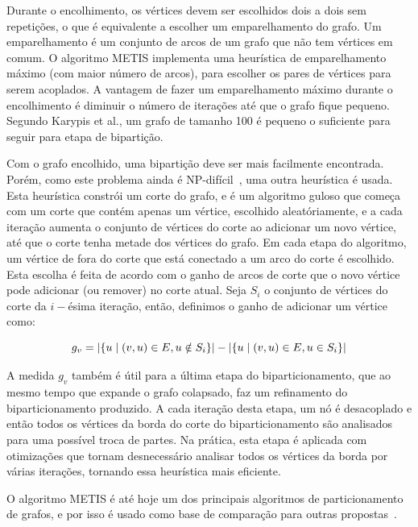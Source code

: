 \documentclass[conference]{IEEEtran}
\DeclarePairedDelimiter\abs{\lvert}{\rvert}
\begin{document}
Durante o encolhimento, os vértices devem ser escolhidos dois a dois sem
repetições, o que é equivalente a escolher um emparelhamento do grafo.
Um emparelhamento é um conjunto de arcos de um grafo que não tem
vértices em comum. O algoritmo METIS implementa uma heurística
de emparelhamento máximo (com maior número de arcos), para escolher os
pares de vértices para serem acoplados. A vantagem de fazer um
emparelhamento máximo durante o encolhimento é diminuir o número de
iterações até que o grafo fique pequeno. Segundo Karypis et al., um
grafo de tamanho 100 é pequeno o suficiente para seguir para etapa de
bipartição.

Com o grafo encolhido, uma bipartição deve ser mais facilmente
encontrada. Porém, como este problema ainda é
NP-difícil~\cite{graphpartitioning}, uma outra heurística é usada. Esta
heurística constrói um corte do grafo, e é um algoritmo guloso que
começa com um corte que contém apenas um vértice, escolhido
aleatóriamente, e a cada iteração aumenta o conjunto de vértices do
corte ao adicionar um novo vértice, até que o corte tenha metade dos
vértices do grafo. Em cada etapa do algoritmo, um vértice de fora do
corte que está conectado a um arco do corte é escolhido. Esta escolha é
feita de acordo com o ganho de arcos de corte que o novo vértice pode
adicionar (ou remover) no corte atual. Seja $S_i$ o conjunto de vértices
do corte da $i-$ésima iteração, então, definimos o ganho de adicionar um
vértice como:

\begin{equation}
    g_v = \abs{\{u \mid (v, u) \in E, u \notin S_i\}} -
          \abs{\{u \mid (v, u) \in E, u \in S_i\}}
\end{equation}

A medida $g_v$ também é útil para a última etapa do biparticionamento,
que ao mesmo tempo que expande o grafo colapsado, faz um refinamento do
biparticionamento produzido. A cada iteração desta etapa, um nó é
desacoplado e então todos os vértices da borda do corte do
biparticionamento são analisados para uma possível troca de partes. Na
prática, esta etapa é aplicada com otimizações que tornam desnecessário
analisar todos os vértices da borda por várias iterações, tornando essa
heurística mais eficiente.

O algoritmo METIS é até hoje um dos principais algoritmos de
particionamento de grafos, e por isso é usado como base de comparação
para outras propostas~\cite{baselinemetis}.
\end{document}
